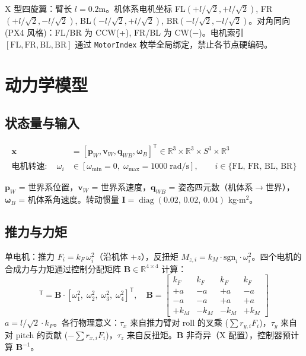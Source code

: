 \documentclass[12pt,a4paper]{article}
\begin{document}
X 型四旋翼：臂长 $l=0.2$m。机体系电机坐标 FL$(+l/\sqrt{2}, +l/\sqrt{2})$, FR$(+l/\sqrt{2}, -l/\sqrt{2})$, BL$(-l/\sqrt{2}, +l/\sqrt{2})$, BR$(-l/\sqrt{2}, -l/\sqrt{2})$。对角同向 (PX4 风格)：FL/BR 为 CCW(+), FR/BL 为 CW($-$)。电机索引 $[\text{FL}, \text{FR}, \text{BL}, \text{BR}]$ 通过 \texttt{MotorIndex} 枚举全局绑定，禁止各节点硬编码。


\section{动力学模型}

\subsection{状态量与输入}

\begin{align}
  \mathbf{x} &= [\mathbf{p}_W, \mathbf{v}_W, \mathbf{q}_{WB}, \boldsymbol{\omega}_B]^{\mathsf{T}}
             \in \mathbb{R}^{3} \times \mathbb{R}^{3} \times S^{3} \times \mathbb{R}^{3} \nonumber \\
  \text{电机转速}: \quad \omega_i &\in [\omega_{\min}=0,\; \omega_{\max}=1000\;\text{rad/s}],
    \qquad i \in \{\text{FL, FR, BL, BR}\} \nonumber
\end{align}

$\mathbf{p}_W$ = 世界系位置，$\mathbf{v}_W$ = 世界系速度，$\mathbf{q}_{WB}$ = 姿态四元数（机体系$\to$世界），$\boldsymbol{\omega}_B$ = 机体系角速度。转动惯量 $\mathbf{I} = \operatorname{diag}(0.02,\,0.02,\,0.04)$ kg$\cdot$m$^2$。

\subsection{推力与力矩}

单电机：推力 $F_i = k_F\,\omega_i^2$（沿机体 $+z$），反扭矩 $M_{z,i} = k_M \cdot \mathrm{sgn}_i \cdot \omega_i^2$。四个电机的合成力与力矩通过控制分配矩阵 $\mathbf{B}\in\mathbb{R}^{4\times 4}$ 计算：
\begin{equation}
  [F,\; \tau_x,\; \tau_y,\; \tau_z]^{\mathsf{T}}
  = \mathbf{B} \cdot [\omega_1^2,\;\omega_2^2,\;\omega_3^2,\;\omega_4^2]^{\mathsf{T}},
  \quad
  \mathbf{B} =
  \begin{bmatrix}
    k_F   &  k_F   &  k_F   &  k_F   \\
    +a    & -a     & +a     & -a     \\
    -a    & -a     & +a     & +a     \\
    +k_M  & -k_M   & -k_M   & +k_M
  \end{bmatrix}
  \label{eq:B}
\end{equation}
$a = l/\sqrt{2} \cdot k_F$。各行物理意义：$\tau_x$ 来自推力臂对 roll 的叉乘 ($\sum r_{y,i}F_i$)，$\tau_y$ 来自对 pitch 的贡献 ($-\sum r_{x,i}F_i$)，$\tau_z$ 来自反扭矩。$\mathbf{B}$ 非奇异（X 配置），控制器预计算 $\mathbf{B}^{-1}$。
\end{document}
